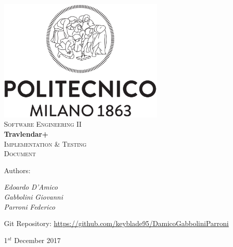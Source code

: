 \documentclass [11pt,a4paper,oneside,openany]{book} %
\begin{document}

\begin{titlepage}

 \begin{center} 
     \includegraphics[height=6cm]{logo.eps}\\
     \vspace{4em}
     {\Large \textsc{Software Engineering II}}\\
     \vspace{6em}
     {\LARGE \textbf{Travlendar+}}\\
     \vspace{3em}
     {\Large \textsc{Implementation \& Testing}}\\
     \vspace{1em}
     {\Large \textsc{Document}}\\
 \end{center}
 
    \vskip 1cm
 
 	Authors:
 	\vspace{0.5em}
 	\begin{center}
      {\Large \textit{Edoardo D'Amico}}\\
      {\Large \textit{Gabbolini Giovanni}}\\
      {\Large \textit{Parroni Federico}}\\
    \end{center}

	\vskip 1.5cm    
    
    \begin{center}
    Git Repository: \url{https://github.com/keyblade95/DamicoGabboliniParroni}
	\end{center}

\vskip 2cm
\begin{center}
{\normalsize 1$^{st}$ December 2017}
\end{center}

\end{titlepage}
\end{document}
